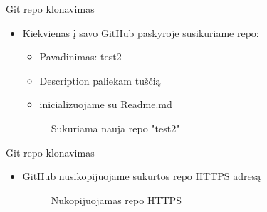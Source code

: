 \documentclass[11pt,xcolor=table]{beamer}
\begin{document}

\begin{frame}{Git repo klonavimas}
\begin{itemize}
\item Kiekvienas į savo GitHub paskyroje susikuriame repo:
\begin{itemize}
\item Pavadinimas: test2
\item Description paliekam tuščią
\item inicializuojame su Readme.md
\end{itemize}
\begin{figure}
\caption{Sukuriama nauja repo "test2"}
\end{figure}
\end{itemize}
\end{frame}


\begin{frame}{Git repo klonavimas}
\begin{itemize}
\item GitHub nusikopijuojame sukurtos repo HTTPS adresą
\begin{figure}
\caption{Nukopijuojamas repo HTTPS}
\end{figure}
\end{itemize}
\end{frame}
\end{document}
